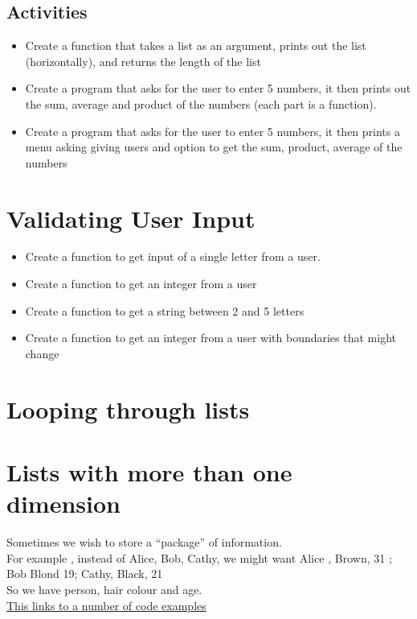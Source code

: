 \documentclass[a4paper,12pt]{article}
\begin{document}
\subsection{Activities}
\begin{itemize}
	\item Create a function that takes a list as an argument, prints out the list (horizontally), and returns the length of the list
	\item Create a program that asks for the user to enter 5 numbers, it then prints out the sum, average  and product of the numbers (each part is a function).
	\item Create a program that asks for the user to enter 5 numbers, it then prints a menu asking giving users and option to get the sum, product, average of the numbers
\end{itemize}
\section{Validating User Input}
\begin{itemize}
\item Create a function to get input of a single letter from a user.
\item  Create a function to get an integer from a user
\item Create a function to get a string between 2 and 5 letters
\item Create a function to get an integer from a user with boundaries that might change
\end{itemize}
\section{Looping through lists}
\section{Lists with more than one dimension}
Sometimes we wish to store a ``package'' of information.\\
For example , instead of Alice, Bob, Cathy, we might want Alice , Brown, 31 ; Bob Blond 19; Cathy, Black, 21\\
So we have person, hair colour and age.\\




\hyperlink{Lists}{This links to a number of code examples}
\newpage
	\hypertarget{Lists}{}




\end{document}
